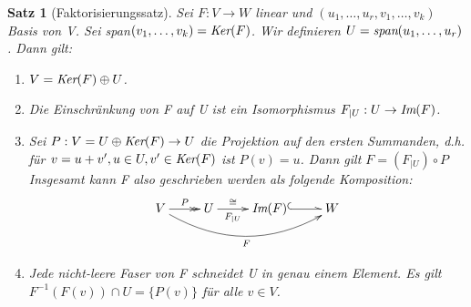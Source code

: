\documentclass[12pt,a4paper]{article}
\theoremstyle{plain}
\newtheorem{Satz}[Theorem]{Satz}
\numberwithin{equation}{section}
\begin{document}
\begin{Satz} [Faktorisierungssatz]
Sei $F:V\rightarrow W$ linear und $(u_1,\ldots,u_r,v_1,\ldots,v_k)$ Basis von V. Sei \emph{span}$(v_1,\ldots,v_k)=\emph{Ker}(F)$. Wir definieren $U=\emph{span}(u_1,\ldots,u_r)$. Dann gilt:
\begin{enumerate}
\renewcommand{\labelenumi}{\emph{(\roman{enumi})}}
\item $V=\emph{Ker}(F)\oplus U$.
\item Die Einschränkung von F auf U ist ein Isomorphismus $F_{|U}:U\rightarrow \emph{Im}(F)$.
\item Sei $P:V=U\oplus\emph{Ker}(F)\rightarrow U$ die Projektion auf den ersten Summanden, d.h. für $v=u+v', u\in U, v'\in \emph{Ker}(F)$ ist $P(v)=u$. Dann gilt $F=(F_{|U})\circ P$
Insgesamt kann F also geschrieben werden als folgende Komposition:
\[ \begin{xy}
	\xymatrix{
		V \ar@{->>}[r]^P \ar@/_ 0.75cm/[rrr]_F & U \ar[r]^/-.5em/{\cong}_/-.5em/{F_{|U}} & \emph{Im}(F) \ar@^{(->}[r] & W
	}
\end{xy} \]
\item Jede nicht-leere Faser von F schneidet U in genau einem Element. Es gilt $F^{-1}(F(v))\cap U=\{P(v)\}$ für alle $v\in V$.
\end{enumerate}
\end{Satz}
\end{document}
